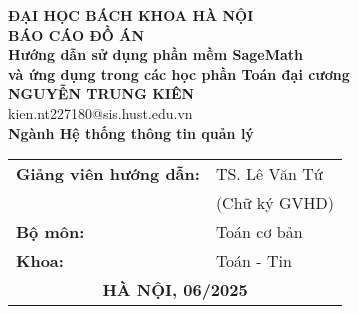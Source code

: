\begin{titlepage}
	\thispagestyle{empty}
	\begin{center}
		{\textbf{\large{ĐẠI HỌC BÁCH KHOA HÀ NỘI}}}\\[4cm]
		
		{\textbf{\huge{BÁO CÁO ĐỒ ÁN}}}\\[1cm]
		{\textbf{\Large{Hướng dẫn sử dụng phần mềm SageMath \\và ứng dụng trong các học phần Toán đại cương}}}\\[1.5cm]
		
		{\textbf{\large{NGUYỄN TRUNG KIÊN}}}\\[0.25cm]
		{\large{kien.nt227180@sis.hust.edu.vn}}\\[0.5cm]
		
		{\textbf{\large{Ngành Hệ thống thông tin quản lý}}}\\
		
		\vspace{2cm}
		
		\begin{table}[H]
			\centering
			\renewcommand{\arraystretch}{1.5}
			\begin{tabular}{ll}
				\textbf{\large{Giảng viên hướng dẫn:}} & \large{TS. Lê Văn Tứ} \hspace{0.5cm} \underline{\hspace{3cm}} \\[0.5cm]
				& \multicolumn{1}{r}{(\large{Chữ ký GVHD)}}  \\[0.5cm]
				\textbf{\large{Bộ môn:}} & \large{Toán cơ bản} \\[0.5cm]
				\textbf{\large{Khoa:}} & \large{Toán - Tin} \\[4cm]
				\multicolumn{2}{c}{\textbf{\large{HÀ NỘI, 06/2025}}}
			\end{tabular}
		\end{table}
		
	\end{center}
\end{titlepage}

